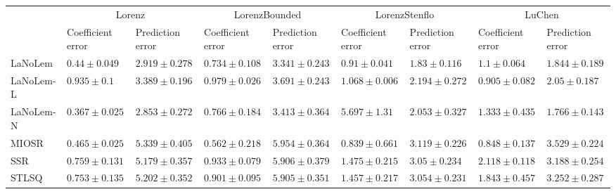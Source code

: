 \begin{table*}
{\begin{tabular}{lllllllll}
 & \multicolumn{2}{c}{Lorenz} & \multicolumn{2}{c}{LorenzBounded} & \multicolumn{2}{c}{LorenzStenflo} & \multicolumn{2}{c}{LuChen} \\
 & Coefficient error & Prediction error & Coefficient error & Prediction error & Coefficient error & Prediction error & Coefficient error & Prediction error \\
\midrule
LaNoLem & $0.44\pm 0.049$ & $2.919\pm 0.278$ & $0.734\pm 0.108$ & $\mathbf{3.341}\pm 0.243$ & $0.91\pm 0.041$ & $\mathbf{1.83}\pm 0.116$ & $1.1\pm 0.064$ & $1.844\pm 0.189$ \\
LaNoLem-L & $0.935\pm 0.1$ & $3.389\pm 0.196$ & $0.979\pm 0.026$ & $3.691\pm 0.243$ & $1.068\pm 0.006$ & $2.194\pm 0.272$ & $0.905\pm 0.082$ & $2.05\pm 0.187$ \\
LaNoLem-N & $\mathbf{0.367}\pm 0.025$ & $\mathbf{2.853}\pm 0.272$ & $0.766\pm 0.184$ & $3.413\pm 0.364$ & $5.697\pm 1.31$ & $2.053\pm 0.327$ & $1.333\pm 0.435$ & $\mathbf{1.766}\pm 0.143$ \\
MIOSR & $0.465\pm 0.025$ & $5.339\pm 0.405$ & $\mathbf{0.562}\pm 0.218$ & $5.954\pm 0.364$ & $\mathbf{0.839}\pm 0.661$ & $3.119\pm 0.226$ & $\mathbf{0.848}\pm 0.137$ & $3.529\pm 0.224$ \\
SSR & $0.759\pm 0.131$ & $5.179\pm 0.357$ & $0.933\pm 0.079$ & $5.906\pm 0.379$ & $1.475\pm 0.215$ & $3.05\pm 0.234$ & $2.118\pm 0.118$ & $3.188\pm 0.254$ \\
STLSQ & $0.753\pm 0.135$ & $5.202\pm 0.352$ & $0.901\pm 0.095$ & $5.905\pm 0.351$ & $1.457\pm 0.217$ & $3.054\pm 0.231$ & $1.843\pm 0.457$ & $3.252\pm 0.287$ \\

\midrule


\end{tabular}}
\end{table*}
